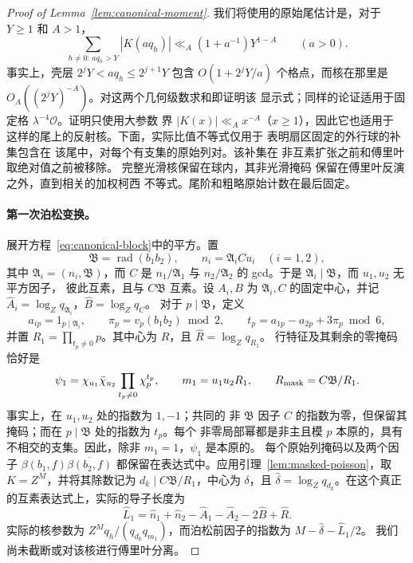 \documentclass[11pt,a4paper]{article}
\numberwithin{equation}{section}
\numberwithin{figure}{section}
\theoremstyle{definition}
\theoremstyle{remark}
\begin{document}
\begin{proof}[Proof of Lemma~\ref{lem:canonical-moment}]
我们将使用的原始尾估计是，对于 \(Y\ge1\) 和 \(A>1\)，
\begin{equation}\label{eq:inverse-raw-tail}
 \sum_{h\ne0:\,a q_h>Y}|K(aq_h)|
 \ll_A(1+a^{-1})Y^{1-A}\qquad(a>0).
\end{equation}
事实上，壳层 \(2^jY<a q_h\le2^{j+1}Y\) 包含
\(O(1+2^jY/a)\) 个格点，而核在那里是
\(O_A((2^jY)^{-A})\)。对这两个几何级数求和即证明该
显示式；同样的论证适用于固定格
\(\lambda^{-4}\mathcal O\)。证明只使用大参数
界 \(|K(x)|\ll_Ax^{-A}\)（\(x\ge1\)），因此它也适用于
这样的尾上的反射核。下面，实际比值不等式仅用于
表明扇区固定的外行球的补集包含在
该尾中，对每个有支集的原始列对。该补集在
非互素扩张之前和傅里叶取绝对值之前被移除。
完整光滑核保留在球内，其非光滑掩码
保留在傅里叶反演之外，直到相关的加权柯西
不等式。尾阶和粗略原始计数在最后固定。

\paragraph{第一次泊松变换。}
展开方程~\eqref{eq:canonical-block}中的平方。置
\[
 \mathfrak B=\operatorname{rad}(b_1b_2),\qquad
 n_i=\mathfrak A_i C u_i\quad(i=1,2),
\]
其中 \(\mathfrak A_i=(n_i,\mathfrak B)\)，而 \(C\) 是
\(n_1/\mathfrak A_1\) 与 \(n_2/\mathfrak A_2\) 的 gcd。于是
\(\mathfrak A_i\mid\mathfrak B\)，而 \(u_1,u_2\) 无平方因子，
彼此互素，且与 \(C\mathfrak B\) 互素。设 \(A_i,B\)
为 \(\mathfrak A_i,C\) 的固定中心，并记
\(\widehat A_i=\log_Zq_{\mathfrak A_i}\)，\(\widehat B=\log_Zq_C\)。
对于 \(p\mid\mathfrak B\)，定义
\[
 a_{ip}=1_{p\mid\mathfrak A_i},\qquad
 \pi_p=v_p(b_1b_2)\bmod2,\qquad
 t_p=a_{1p}-a_{2p}+3\pi_p\bmod6,
\]
并置 \(R_1=\prod_{t_p\ne0}p\)。其中心为 \(R\)，且
\(\widehat R=\log_Zq_{R_1}\)。
行特征及其剩余的零掩码恰好是
\begin{equation}\label{eq:first-masked-data}
 \psi_1=\chi_{u_1}\bar\chi_{u_2}
               \prod_{t_p\ne0}\chi_p^{t_p},\qquad
 m_1=u_1u_2R_1,\qquad
 R_{\rm mask}=C\mathfrak B/R_1.
\end{equation}
事实上，在 \(u_1,u_2\) 处的指数为 \(1,-1\)；共同的
非 \(\mathfrak B\) 因子 \(C\) 的指数为零，但保留其
掩码；而在 \(p\mid\mathfrak B\) 处的指数为 \(t_p\)。每个
非零局部幂都是非主且模 \(p\) 本原的，具有
不相交的支集。因此，除非 \(m_1=1\)，\(\psi_1\) 是本原的。
每个原始列掩码以及两个因子
\(\beta(b_1,f)\overline{\beta(b_2,f)}\) 都保留在表达式中。应用引理~\ref{lem:masked-poisson}，取 \(K=Z^M\)，并将其除数记为 \(d_k\mid C\mathfrak B/R_1\)，中心为 \(\delta\)，且
\(\widehat\delta=\log_Zq_{d_k}\)。在这个真正的互素表达式上，实际的导子长度为
\begin{equation}\label{eq:first-poisson-lengths}
 \widehat L_1=\widehat n_1+\widehat n_2-\widehat A_1-\widehat A_2
                    -2\widehat B+\widehat R.
\end{equation}
实际的核参数为 \(Z^Mq_h/(q_{d_k}q_{m_1})\)，而泊松前因子的指数为 \(M-\widehat\delta-\widehat L_1/2\)。
我们尚未截断或对该核进行傅里叶分离。


\end{proof}
\end{document}
